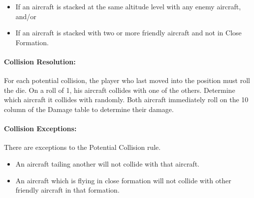 \begin{itemize}
    \item If an aircraft is stacked at the same altitude level with any enemy aircraft, and/or
    \item If an aircraft is stacked with two or more friendly aircraft and not in Close Formation.
\end{itemize}

\paragraph{Collision Resolution:} For each potential collision, the player who last moved into the position must roll the die. On a roll of 1, his aircraft collides with one of the others. Determine which aircraft it collides with randomly. Both aircraft immediately roll on the 10 column of the Damage table to determine their damage.

\paragraph{Collision Exceptions:} There are  exceptions to the Potential Collision rule.

\begin{itemize}
    \item An aircraft tailing another will not collide with that aircraft.
    \item An aircraft which is flying in close formation will not collide with other friendly aircraft in that formation.
\end{itemize}


